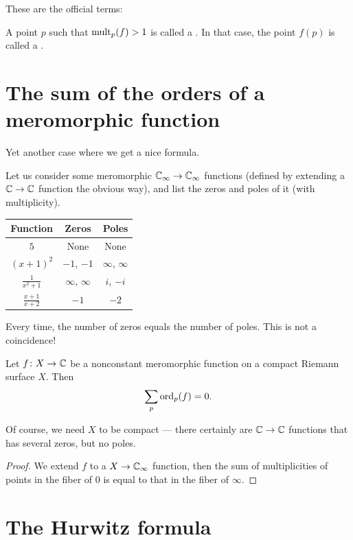 These are the official terms:
\begin{definition}
	A point $p$ such that $\operatorname{mult}_p(f) > 1$ is called a .
	In that case, the point $f(p)$ is called a .
\end{definition}

\section{The sum of the orders of a meromorphic function}

Yet another case where we get a nice formula.
\begin{example}
	Let us consider some meromorphic $\mathbb C_\infty \to \mathbb C_\infty$ functions (defined by extending a
	$\mathbb C \to \mathbb C$ function the obvious way), and list the zeros and poles of it (with
	multiplicity).
	\begin{center}
	\begin{tabular}{ccc}
		Function & Zeros & Poles \\ \hline
		$5$ & None & None \\
		$(x+1)^2$ & $-1$, $-1$ & $\infty$, $\infty$ \\
		$\frac{1}{x^2+1}$ & $\infty$, $\infty$ & $i$, $-i$ \\
		$\frac{x+1}{x+2}$ & $-1$ & $-2$
	\end{tabular}
	\end{center}
\end{example}
Every time, the number of zeros equals the number of poles. This is not a coincidence!
\begin{proposition}
	Let $f \colon X \to \mathbb C$ be a nonconstant meromorphic function on a compact Riemann surface $X$.
	Then \[\sum_p \operatorname{ord}_p(f) = 0. \]
\end{proposition}
Of course, we need $X$ to be compact --- there certainly are $\mathbb C \to \mathbb C$ functions that has
several zeros, but no poles.
\begin{proof}
	We extend $f$ to a $X \to \mathbb C_\infty$ function, then the sum of multiplicities of points in the
	fiber of $0$ is equal to that in the fiber of $\infty$.
\end{proof}

\section{The Hurwitz formula}


